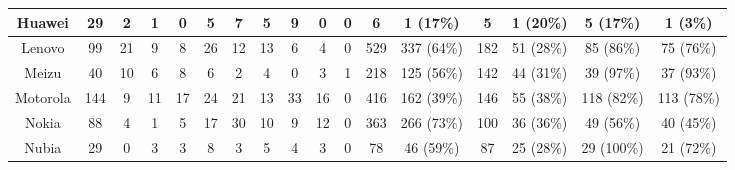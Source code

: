 \begin{table*}[th]
\begin{threeparttable}
{\begin{tabular}{|c|c|ccccccccc|cc|cc|cc|}
Huawei                 & 29                            & \multicolumn{1}{c|}{2}      & \multicolumn{1}{c|}{1}   & \multicolumn{1}{c|}{0}   & \multicolumn{1}{c|}{5}   & \multicolumn{1}{c|}{7}   & \multicolumn{1}{c|}{5}   & \multicolumn{1}{c|}{9}   & \multicolumn{1}{c|}{0}   & 0   & 6            & 1 (17\%)           & 5            & 1 (20\%)           & 5 (17\%)          & 1 (3\%)            \\ \hline
Lenovo                 & 99                            & \multicolumn{1}{c|}{21}     & \multicolumn{1}{c|}{9}   & \multicolumn{1}{c|}{8}   & \multicolumn{1}{c|}{26}  & \multicolumn{1}{c|}{12}  & \multicolumn{1}{c|}{13}  & \multicolumn{1}{c|}{6}   & \multicolumn{1}{c|}{4}   & 0   & 529          & 337 (64\%)         & 182          & 51 (28\%)          & 85 (86\%)         & 75 (76\%)          \\ \hline
Meizu                  & 40                            & \multicolumn{1}{c|}{10}     & \multicolumn{1}{c|}{6}   & \multicolumn{1}{c|}{8}   & \multicolumn{1}{c|}{6}   & \multicolumn{1}{c|}{2}   & \multicolumn{1}{c|}{4}   & \multicolumn{1}{c|}{0}   & \multicolumn{1}{c|}{3}   & 1   & 218          & 125 (56\%)         & 142          & 44 (31\%)          & 39 (97\%)         & 37 (93\%)          \\ \hline
Motorola               & 144                           & \multicolumn{1}{c|}{9}      & \multicolumn{1}{c|}{11}  & \multicolumn{1}{c|}{17}  & \multicolumn{1}{c|}{24}  & \multicolumn{1}{c|}{21}  & \multicolumn{1}{c|}{13}  & \multicolumn{1}{c|}{33}  & \multicolumn{1}{c|}{16}  & 0   & 416          & 162 (39\%)         & 146          & 55 (38\%)          & 118 (82\%)        & 113 (78\%)         \\ \hline
Nokia                  & 88                            & \multicolumn{1}{c|}{4}      & \multicolumn{1}{c|}{1}   & \multicolumn{1}{c|}{5}   & \multicolumn{1}{c|}{17}  & \multicolumn{1}{c|}{30}  & \multicolumn{1}{c|}{10}  & \multicolumn{1}{c|}{9}   & \multicolumn{1}{c|}{12}  & 0   & 363          & 266 (73\%)         & 100          & 36 (36\%)          & 49 (56\%)         & 40 (45\%)          \\ \hline
Nubia                  & 29                            & \multicolumn{1}{c|}{0}      & \multicolumn{1}{c|}{3}   & \multicolumn{1}{c|}{3}   & \multicolumn{1}{c|}{8}   & \multicolumn{1}{c|}{3}   & \multicolumn{1}{c|}{5}   & \multicolumn{1}{c|}{4}   & \multicolumn{1}{c|}{3}   & 0   & 78           & 46 (59\%)          & 87           & 25 (28\%)          & 29 (100\%)        & 21 (72\%)          \\ \hline

\end{tabular}}
\end{threeparttable}
\end{table*}
